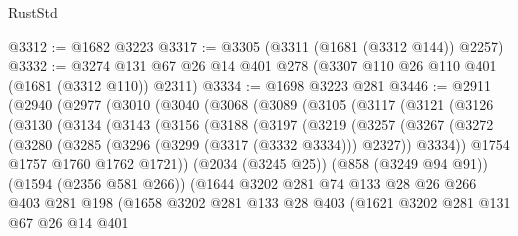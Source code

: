 \begin{lexlean}{RustStd}
\begin{coremodule}
@3312 := @1682 @3223
@3317 := @3305 (@3311 (@1681 (@3312 @144)) @2257)
@3332 := @3274 @131 @67 @26 @14 @401 @278 (@3307 @110 @26 @110 @401 (@1681 (@3312 @110)) @2311)
@3334 := @1698 @3223 @281
@3446 := @2911
    (@2940
      (@2977
        (@3010
          (@3040
            (@3068
              (@3089
                (@3105
                  (@3117
                    (@3121
                      (@3126
                        (@3130
                          (@3134
                            (@3143
                              (@3156
                                (@3188
                                  (@3197
                                    (@3219
                                      (@3257
                                        (@3267
                                          (@3272
                                            (@3280
                                              (@3285 (@3296 (@3299 (@3317 (@3332 @3334))) @2327))
                                              @3334))
                                          @1754
                                          @1757
                                          @1760
                                          @1762
                                          @1721))
                                      (@2034 (@3245 @25))
                                      (@858 (@3249 @94 @91))
                                      (@1594 (@2356 @581 @266))
                                      (@1644
                                        @3202
                                        @281
                                        @74
                                        @133
                                        @28
                                        @26
                                        @266
                                        @403
                                        @281
                                        @198
                                        (@1658
                                          @3202
                                          @281
                                          @133
                                          @28
                                          @403
                                          (@1621
                                            @3202
                                            @281
                                            @131
                                            @67
                                            @26
                                            @14
                                            @401

\end{coremodule}
\end{lexlean}
